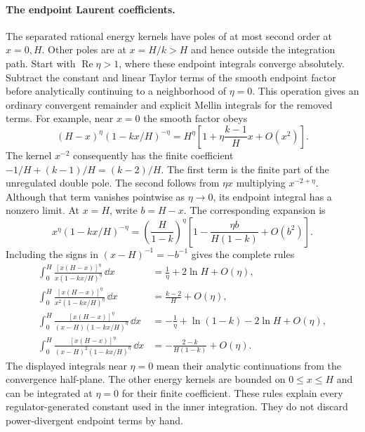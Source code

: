 \paragraph{The endpoint Laurent coefficients.}
The separated rational energy kernels have poles of at most second
order at $x=0,H$. Other poles are at $x=H/k>H$ and hence outside the
integration path. Start with $\operatorname{Re}\eta>1$, where these
endpoint integrals converge absolutely. Subtract the constant and linear
Taylor terms of the smooth endpoint factor before analytically continuing
to a neighborhood of $\eta=0$. This operation gives an ordinary convergent
remainder and explicit Mellin integrals for the removed terms.
For example, near $x=0$ the smooth factor obeys
\begin{equation}
 (H-x)^\eta(1-kx/H)^{-\eta}
 =H^\eta\left[1+\eta\frac{k-1}{H}x+O(x^2)\right].
\end{equation}
The kernel $x^{-2}$ consequently has the finite coefficient
$-1/H+(k-1)/H=(k-2)/H$. The first term is the finite part of the
unregulated double pole. The second follows from $\eta x$ multiplying
$x^{-2+\eta}$. Although that term vanishes pointwise as $\eta\to0$,
its endpoint integral has a nonzero limit.
At $x=H$, write $b=H-x$. The corresponding expansion is
\begin{equation}
 x^\eta(1-kx/H)^{-\eta}
 =\left(\frac H{1-k}\right)^\eta
 \left[1-\frac{\eta b}{H(1-k)}+O(b^2)\right].
\end{equation}
Including the signs in $(x-H)^{-1}=-b^{-1}$ gives the complete rules
\begin{align}
 \int_0^H\frac{[x(H-x)]^\eta}{x(1-kx/H)^\eta}\,\dd x
 &=\frac1\eta+2\ln H+O(\eta),\\
 \int_0^H\frac{[x(H-x)]^\eta}{x^2(1-kx/H)^\eta}\,\dd x
 &=\frac{k-2}{H}+O(\eta),\\
 \int_0^H\frac{[x(H-x)]^\eta}{(x-H)(1-kx/H)^\eta}\,\dd x
 &=-\frac1\eta+\ln(1-k)-2\ln H+O(\eta),\\
 \int_0^H\frac{[x(H-x)]^\eta}{(x-H)^2(1-kx/H)^\eta}\,\dd x
 &=-\frac{2-k}{H(1-k)}+O(\eta).
\end{align}
The displayed integrals near $\eta=0$ mean their analytic continuations
from the convergence half-plane. The other energy kernels are bounded
on $0\leq x\leq H$ and can be integrated at $\eta=0$ for their finite
coefficient. These rules explain every regulator-generated constant used
in the inner integration. They do not discard power-divergent endpoint
terms by hand.

